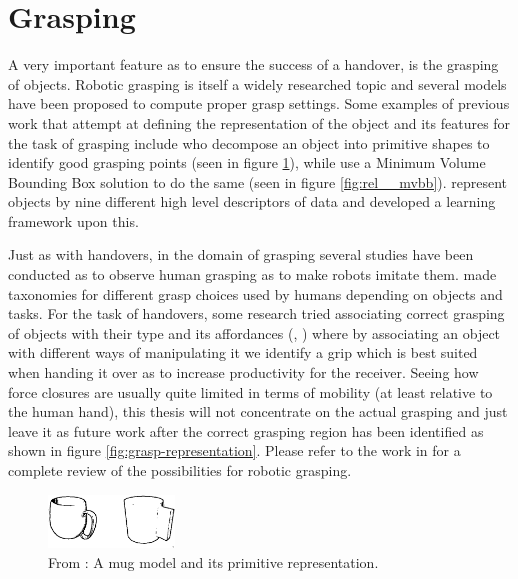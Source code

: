 \section{Grasping}
A very important feature as to ensure the success of a handover, is the grasping of objects. Robotic grasping is itself a widely researched topic and several models have been proposed to compute proper grasp settings. Some examples of previous work that attempt at defining the representation of the object and its features for the task of grasping include \textcite{Miller2003} who decompose an object into primitive shapes to identify good grasping points (seen in figure \ref{fig:rel__shape-primitives}), while \textcite{Huebner2008} use a Minimum Volume Bounding Box solution to do the same (seen in figure \ref{fig:rel__mvbb}). \textcite{Morales} represent objects by nine different high level descriptors of data and developed a learning framework upon this.

Just as with handovers, in the domain of grasping several studies have been conducted as to observe human grasping as to make robots imitate them. \parencite{Cutkosky1990} \parencite{Feix2009} \parencite{Kang1993} made taxonomies for different grasp choices used by humans depending on objects and tasks. For the task of handovers, some research tried associating correct grasping of objects with their type and its affordances (\parencite{Song2015}, \parencite{Chan2014}) where by associating an object with different ways of manipulating it we identify a grip which is best suited when handing it over as to increase productivity for the receiver. Seeing how force closures are usually quite limited in terms of mobility (at least relative to the human hand), this thesis will not concentrate on the actual grasping and just leave it as future work after the correct grasping region has been identified as shown in figure \ref{fig:grasp-representation}. Please refer to the work in \parencite{Sahbani2012} for a complete review of the possibilities for robotic grasping.

\begin{figure}
	\centering
	\includegraphics[width=0.3\textwidth]{img/related-work/shape-primitives.png}
	\caption{From \parencite{Miller2003}: A mug model and its primitive representation.}
	\label{fig:rel__shape-primitives}
\end{figure}

